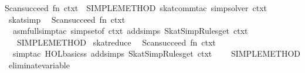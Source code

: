\begin{isabellebody}
Scan{}succeed\ {}fn\ ctxt\ {}{}\ SIMPLE{}METHOD{}\ {}skat{}comm{}tac\ simp{}solver\ ctxt{}{}\isanewline
{}\isanewline
\isanewline
{}\isamarkupfalse%
\ skat{}simp\ {}\ {}\isanewline
Scan{}succeed\ {}fn\ ctxt\ {}{}\isanewline
\ \ asm{}full{}simp{}tac\ {}simpset{}of\ ctxt\ addsimps\ SkatSimpRules{}get\ ctxt{}\ {}\isanewline
\ \ {}{}\ SIMPLE{}METHOD{}\isanewline
{}\isanewline
\isanewline
{}\isamarkupfalse%
\ skat{}reduce\ {}\ {}\isanewline
Scan{}succeed\ {}fn\ ctxt\ {}{}\isanewline
\ \ simp{}tac\ {}HOL{}basic{}ss\ addsimps\ SkatSimpRules{}get\ ctxt{}\ {}\isanewline
\ \ {}{}\ SIMPLE{}METHOD{}\isanewline
{}\isanewline
\isanewline
{}\isamarkupfalse%
\ eliminate{}variable\ {}\ {}\isanewline

\end{isabellebody}

